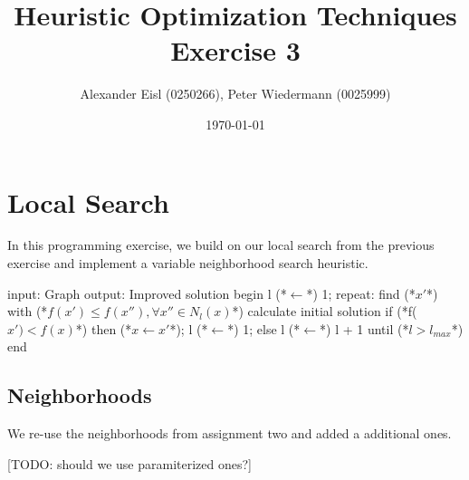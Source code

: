 \documentclass{scrartcl}
\author{Alexander Eisl (0250266), Peter Wiedermann (0025999)}
\date{\today}
\title{Heuristic Optimization Techniques \\ Exercise 3}
\begin{document}
\maketitle


\section{Local Search}
\label{sec:deterministic}
In this programming exercise, we build on our local search from the
previous exercise and implement a variable neighborhood search
heuristic.

\begin{algorithm}[caption={Variable Neighborhood Search}]
    input: Graph 
    output: Improved solution
    begin
        l (*$\leftarrow$*) 1;
	repeat:
    	find (*$x'$*) with (*$f(x') \leq f(x''), \forall x'' \in N_l(x) $*) calculate initial solution
        if (*f($x') < f(x)$*) then
           (*$x \leftarrow x'$*);
           l (*$\leftarrow$*) 1;
        else 
           l (*$\leftarrow$*) l + 1
	until  (*$l > l_{max}$*)
    end
\end{algorithm}


\subsection{Neighborhoods}
\label{neighborhoods}
We re-use the neighborhoods from assignment two and added a additional ones.

[TODO: should we use paramiterized ones?]
\end{document}
